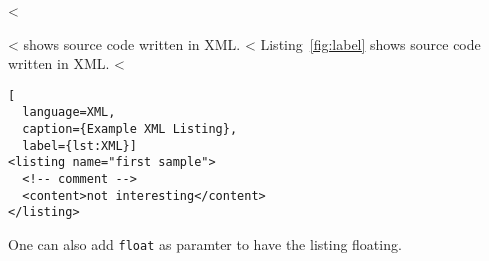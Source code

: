 <%

\begin{WSample}
<%
 shows source code written in XML.
<%
Listing~\ref{fig:label} shows source code written in XML.
<%

\begin{lstlisting}[
  language=XML,
  caption={Example XML Listing},
  label={lst:XML}]
<listing name="first sample">
  <!-- comment -->
  <content>not interesting</content>
</listing>
\end{lstlisting}
\end{WSample}
\PexaShowBoth{}

One can also add \verb+float+ as paramter to have the listing floating.
